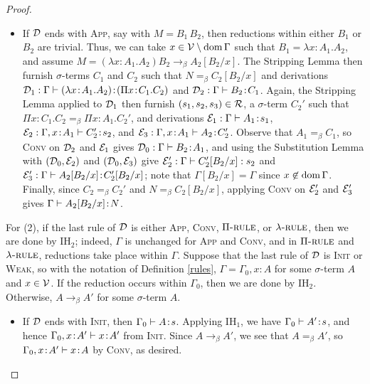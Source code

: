 \documentclass[reqno, twoside]{article}
\begin{document}
\begin{proof}
\begin{itemize}
                \vspace{-0.05in}
            \item If $\mathcal{D}$ ends with \textsc{App}, say with $M=B_1\,B_2$, then reductions within either $B_1$ or $B_2$ are trivial. Thus, we can take $x\in\mathcal{V}\setminus\operatorname{dom}\Gamma$ such that $B_1=\lambda x\!:\!A_1.A_2$, and assume $M=(\lambda x\!:\!A_1.A_2)B_2\rightarrow_\beta A_2[B_2/x]$. The Stripping Lemma then furnish $\sigma$-terms $C_1$ and $C_2$ such that $N=_\beta C_2[B_2/x]$ and derivations $\mathcal{D}_1:\Gamma\vdash(\lambda x\!:\!A_1.A_2)\!:\!(\Pi x\!:\!C_1.C_2)$ and $\mathcal{D}_2:\Gamma\vdash B_2\!:\!C_1$. Again, the Stripping Lemma applied to $\mathcal{D}_1$ then furnish $(s_1,s_2,s_3)\in\mathcal{R}$, a $\sigma$-term $C_2'$ such that $\Pi x\!:\!C_1.C_2=_\beta\Pi x\!:\!A_1.C_2'$, and derivations $\mathcal{E}_1:\Gamma\vdash A_1\!:\!s_1$, $\mathcal{E}_2:\Gamma,x\!:\!A_1\vdash C'_2\!:\!s_2$, and $\mathcal{E}_3:\Gamma,x\!:\!A_1\vdash A_2\!:\!C_2'$. Observe that $A_1=_\beta C_1$, so \textsc{Conv} on $\mathcal{D}_2$ and $\mathcal{E}_1$ gives $\mathcal{D}_0:\Gamma\vdash B_2\!:\!A_1$, and using the Substitution Lemma with $(\mathcal{D}_0,\mathcal{E}_2)$ and $(\mathcal{D}_0,\mathcal{E}_3)$ give $\mathcal{E}_2':\Gamma\vdash C_2'[B_2/x]:s_2$ and $\mathcal{E}_3':\Gamma\vdash A_2[B_2/x]\!:\!C_2'[B_2/x]$; note that $\Gamma[B_2/x]=\Gamma$ since $x\not\in\operatorname{dom}\Gamma$. Finally, since $C_2=_\beta C_2'$ and $N=_\beta C_2[B_2/x]$, applying \textsc{Conv} on $\mathcal{E}_2'$ and $\mathcal{E}_3'$ gives $\Gamma\vdash A_2[B_2/x]\!:\!N$.
        \end{itemize}
        For (2), if the last rule of $\mathcal{D}$ is either \textsc{App}, \textsc{Conv}, $\Pi{\normalfont\textsc{-rule}}$, or $\lambda{\normalfont\textsc{-rule}}$, then we are done by $\mathrm{IH}_2$; indeed, $\Gamma$ is unchanged for \textsc{App} and \textsc{Conv}, and in $\Pi{\normalfont\textsc{-rule}}$ and $\lambda{\normalfont\textsc{-rule}}$, reductions take place within $\Gamma$. Suppose that the last rule of $\mathcal{D}$ is \textsc{Init} or \textsc{Weak}, so with the notation of Definition \ref{rules}, $\Gamma=\Gamma_0,x\!:\!A$ for some $\sigma$-term $A$ and $x\in\mathcal{V}$. If the reduction occurs within $\Gamma_0$, then we are done by $\mathrm{IH}_2$. Otherwise, $A\rightarrow_\beta A'$ for some $\sigma$-term $A$.
        \begin{itemize}\small\vspace{-0.05in}
            \item If $\mathcal{D}$ ends with \textsc{Init}, then $\Gamma_0\vdash A\!:\!s$. Applying $\mathrm{IH}_1$, we have $\Gamma_0\vdash A'\!:\!s$, and hence $\Gamma_0,x\!:\!A'\vdash x\!:\!A'$ from \textsc{Init}. Since $A\rightarrow_\beta A'$, we see that $A=_\beta A'$, so $\Gamma_0,x\!:\!A'\vdash x\!:\!A$ by \textsc{Conv}, as desired.

\end{itemize}
\end{proof}
\end{document}
